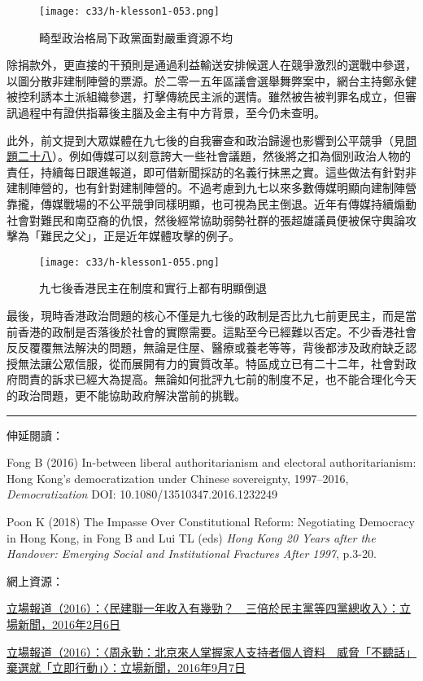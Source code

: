 \begin{figure}[htbp]
    \centering
    \texttt{[image: c33/h-klesson1-053.png]}
    \caption{畸型政治格局下政黨面對嚴重資源不均} 
\end{figure}

除捐款外，更直接的干預則是通過利益輸送安排候選人在競爭激烈的選戰中參選，以圖分散非建制陣營的票源。於二零一五年區議會選舉舞弊案中，網台主持鄭永健被控利誘本土派組織參選，打擊傳統民主派的選情。雖然被告被判罪名成立，但審訊過程中有證供指幕後主腦及金主有中方背景，至今仍未查明。

此外，前文提到大眾媒體在九七後的自我審查和政治歸邊也影響到公平競爭（見\hyperref[sec:sec28]{問題二十八}）。例如傳媒可以刻意誇大一些社會議題，然後將之扣為個別政治人物的責任，持續每日跟進報道，即可借新聞採訪的名義行抹黑之實。這些做法有針對非建制陣營的，也有針對建制陣營的。不過考慮到九七以來多數傳媒明顯向建制陣營靠攏，傳媒戰場的不公平競爭同樣明顯，也可視為民主倒退。近年有傳媒持續煽動社會對難民和南亞裔的仇恨，然後經常協助弱勢社群的張超雄議員便被保守輿論攻擊為「難民之父」，正是近年媒體攻擊的例子。

\begin{figure}[htbp]
    \centering
    \texttt{[image: c33/h-klesson1-055.png]}
    \caption{九七後香港民主在制度和實行上都有明顯倒退} 
\end{figure}

最後，現時香港政治問題的核心不僅是九七後的政制是否比九七前更民主，而是當前香港的政制是否落後於社會的實際需要。這點至今已經難以否定。不少香港社會反反覆覆無法解決的問題，無論是住屋、醫療或養老等等，背後都涉及政府缺乏認授無法讓公眾信服，從而展開有力的實質改革。特區成立已有二十二年，社會對政府問責的訴求已經大為提高。無論如何批評九七前的制度不足，也不能合理化今天的政治問題，更不能協助政府解決當前的挑戰。

\rule[-10pt]{15cm}{0.05em}

伸延閱讀：

Fong B (2016) In-between liberal authoritarianism and electoral authoritarianism: Hong Kong’s democratization under Chinese sovereignty, 1997–2016, \textit{Democratization} DOI: 10.1080/13510347.2016.1232249

Poon K (2018) The Impasse Over Constitutional Reform: Negotiating Democracy in Hong Kong, in Fong B and Lui TL (eds) \textit{Hong Kong 20 Years after the Handover: Emerging Social and Institutional Fractures After 1997}, p.3-20.

網上資源：

\href{https://thestandnews.com/politics/政黨財力比恲-民建聯一年收入有幾勁-三倍於民主黨等四黨總收入/}{立場報道（2016）：〈民建聯一年收入有幾勁？　三倍於民主黨等四黨總收入〉：立場新聞，2016年2月6日}

\href{https://www.thestandnews.com/politics/周永勤-北京來人說出多名支持者個人資料-威脅-不聽話-棄選就-立即行動/}{立場報道（2016）：〈周永勤：北京來人掌握家人支持者個人資料　威脅「不聽話」棄選就「立即行動」〉：立場新聞，2016年9月7日}